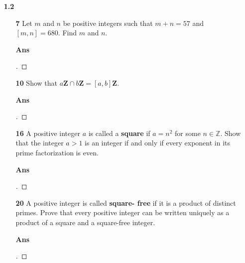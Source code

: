 \documentclass[paper=usletter, fontsize=12pt]{article}
\begin{document}
\begin{itemize}
\begin{itemize}
            \end{itemize}

        \item[\textbf{1.2}]

        \begin{itemize}

            \item[\textbf{7}] Let $m$ and $n$ be positive integers such that $m
            + n = 57$ and $[m, n] = 680$. Find $m$ and $n$.
            \item[\textbf{Ans}]
            \begin{proof}[\unskip\nopunct]
            \end{proof}
            \vspace{0.2in}

            \item[\textbf{10}] Show that $a\textbf{Z} \cap b\textbf{Z} = [a,
            b]\textbf{Z}$.
            \item[\textbf{Ans}]
            \begin{proof}[\unskip\nopunct]
            \end{proof}
            \vspace{0.2in}

            \item[\textbf{16}] A positive integer $a$ is called a
            \textbf{square} if $a = n^2$ for some $n \in \mathbb{Z}$. Show that
            the integer $a > 1$ is an integer if and only if every exponent in
            its prime factorization is even.
            \item[\textbf{Ans}]
            \begin{proof}[\unskip\nopunct]
            \end{proof}
            \vspace{0.2in}

            \item[\textbf{20}] A positive integer is called \textbf{square-
            free} if it is a product of distinct primes. Prove that every
            positive integer can be written uniquely as a product of a square
            and a square-free integer.
            \item[\textbf{Ans}]
            \begin{proof}[\unskip\nopunct]
            \end{proof}
            \vspace{0.2in}

        \end{itemize}

    \end{itemize}
\end{document}
